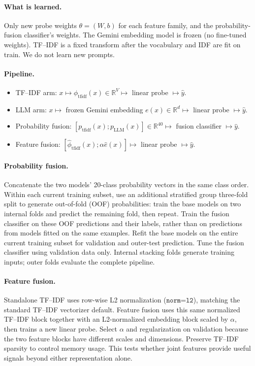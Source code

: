 ﻿\documentclass[11pt,letterpaper]{article}
\begin{document}
\paragraph{What is learned.}
Only new probe weights $\theta=(W,b)$ for each feature family, and the probability-fusion classifier's weights. The Gemini embedding model is frozen (no fine-tuned weights). TF--IDF is a fixed transform after the vocabulary and IDF are fit on train. We do not learn new prompts.

\paragraph{Pipeline.}
\begin{itemize}
  \item TF--IDF arm: $x\mapsto \phi_{\mathrm{tfidf}}(x)\in\mathbb{R}^{V}\mapsto$ linear probe $\mapsto\hat{y}$.
  \item LLM arm: $x\mapsto$ frozen Gemini embedding $e(x)\in\mathbb{R}^{d}\mapsto$ linear probe $\mapsto\hat{y}$.
  \item Probability fusion: $[p_{\mathrm{tfidf}}(x);p_{\mathrm{LLM}}(x)]\in\mathbb{R}^{40}\mapsto$ fusion classifier $\mapsto\hat{y}$.
  \item Feature fusion: $[\widehat\phi_{\mathrm{tfidf}}(x);\alpha\widehat e(x)]\mapsto$ linear probe $\mapsto\hat{y}$.
\end{itemize}

\paragraph{Probability fusion.}
Concatenate the two models' 20-class probability vectors in the same class order. Within each current training subset, use an additional stratified group three-fold split to generate out-of-fold (OOF) probabilities: train the base models on two internal folds and predict the remaining fold, then repeat. Train the fusion classifier on these OOF predictions and their labels, rather than on predictions from models fitted on the same examples. Refit the base models on the entire current training subset for validation and outer-test prediction. Tune the fusion classifier using validation data only. Internal stacking folds generate training inputs; outer folds evaluate the complete pipeline.

\paragraph{Feature fusion.}
Standalone TF--IDF uses row-wise L2 normalization ($\texttt{norm=l2}$), matching the standard TF--IDF vectorizer default. Feature fusion uses this same normalized TF--IDF block together with an L2-normalized embedding block scaled by $\alpha$, then trains a new linear probe. Select $\alpha$ and regularization on validation because the two feature blocks have different scales and dimensions. Preserve TF--IDF sparsity to control memory usage. This tests whether joint features provide useful signals beyond either representation alone.
\end{document}
